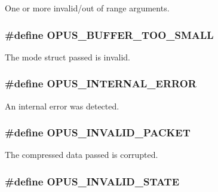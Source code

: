 One or more invalid/out of range arguments. \hypertarget{group__opus__errorcodes_gacd897c05563ec04a67d8e92ba29f3d4f}{
\subsubsection[{OPUS\_\-BUFFER\_\-TOO\_\-SMALL}]{\setlength{\rightskip}{0pt plus 5cm}\#define OPUS\_\-BUFFER\_\-TOO\_\-SMALL}}
\label{group__opus__errorcodes_gacd897c05563ec04a67d8e92ba29f3d4f}


The mode struct passed is invalid. \hypertarget{group__opus__errorcodes_gae1f952c366ebd380df9efa1842635a0b}{
\subsubsection[{OPUS\_\-INTERNAL\_\-ERROR}]{\setlength{\rightskip}{0pt plus 5cm}\#define OPUS\_\-INTERNAL\_\-ERROR}}
\label{group__opus__errorcodes_gae1f952c366ebd380df9efa1842635a0b}


An internal error was detected. \hypertarget{group__opus__errorcodes_ga46fc9dd493fb8e291bd8e838f0988bb7}{
\subsubsection[{OPUS\_\-INVALID\_\-PACKET}]{\setlength{\rightskip}{0pt plus 5cm}\#define OPUS\_\-INVALID\_\-PACKET}}
\label{group__opus__errorcodes_ga46fc9dd493fb8e291bd8e838f0988bb7}


The compressed data passed is corrupted. \hypertarget{group__opus__errorcodes_ga54416ec79619179d688918f25e9b20e3}{
\subsubsection[{OPUS\_\-INVALID\_\-STATE}]{\setlength{\rightskip}{0pt plus 5cm}\#define OPUS\_\-INVALID\_\-STATE}}
\label{group__opus__errorcodes_ga54416ec79619179d688918f25e9b20e3}



